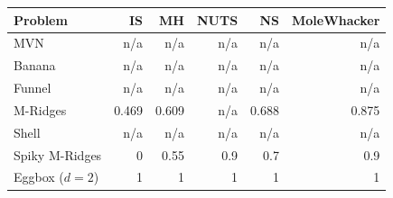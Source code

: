 \begin{tabular}{lrrrrr}
\toprule
Problem & IS & MH & NUTS & NS & MoleWhacker \\
\midrule
MVN & n/a & n/a & n/a & n/a & n/a \\
Banana & n/a & n/a & n/a & n/a & n/a \\
Funnel & n/a & n/a & n/a & n/a & n/a \\
M-Ridges & 0.469 & 0.609 & n/a & 0.688 & 0.875 \\
Shell & n/a & n/a & n/a & n/a & n/a \\
Spiky M-Ridges & 0 & 0.55 & 0.9 & 0.7 & 0.9 \\
\midrule
Eggbox ($d=2$) & 1 & 1 & 1 & 1 & 1 \\
\bottomrule
\end{tabular}
